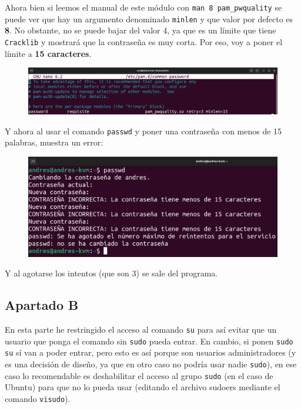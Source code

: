 \documentclass{article}
\begin{document}
Ahora bien si leemos el manual de este módulo con \verb|man 8 pam_pwquality| se puede ver que hay un argumento denominado \verb|minlen| y que valor por defecto es \textbf{8}. No obstante, no se puede bajar del valor 4, ya que es un límite que tiene \verb|Cracklib| y mostrará que la contraseña es muy corta. Por eso, voy a poner el límite a \textbf{15 caracteres}.

\begin{figure}[H]
    \includegraphics[width=\textwidth]{imagenes/passwordminlen15.png}
\end{figure}

\bigskip

Y ahora al usar el comando \verb|passwd| y poner una contraseña con menos de 15 palabras, muestra un error:

\begin{figure}[H]
    \includegraphics[width=\textwidth]{imagenes/passwordminlen15passwd.png}
\end{figure}

Y al agotarse los intentos (que son 3) se sale del programa.

\newpage

\subsection*{Apartado B}
En esta parte he restringido el acceso al comando \verb|su| para así evitar que un usuario que ponga el comando sin \verb|sudo| pueda entrar. En cambio, si ponen \verb|sudo su| sí van a poder entrar, pero esto es así porque son usuarios administradores (y es una decisión de diseño, ya que en otro caso no podría usar nadie \verb|sudo|), en ese caso lo recomendable es deshabilitar el acceso al grupo \verb|sudo| (en el caso de Ubuntu) para que no lo pueda usar (editando el archivo sudoers mediante el comando \verb|visudo|).
\end{document}
